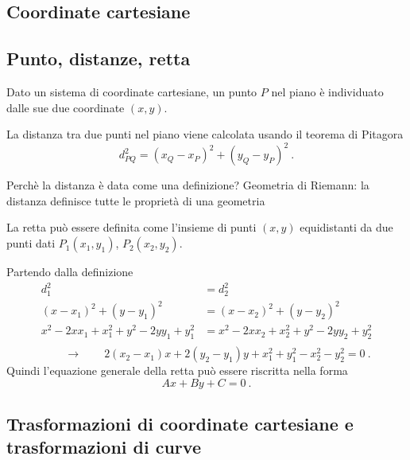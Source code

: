 \subsection{Coordinate cartesiane}
\subsection{Punto, distanze, retta}
\begin{definition}[Punto]
Dato un sistema di coordinate cartesiane, un punto $P$ nel piano è individuato dalle sue due coordinate $(x,y)$.
\end{definition}
\begin{definition}
La distanza tra due punti nel piano viene calcolata usando il teorema di Pitagora
\begin{equation}
    d_{PQ}^2 = (x_Q - x_P)^2 + (y_Q - y_P)^2 \ .
\end{equation}
\end{definition}
{\color{red} Perchè la distanza è data come una definizione? Geometria di Riemann: la distanza definisce tutte le proprietà di una geometria}

\begin{definition}[Retta]
    La retta può essere definita come l'insieme di punti $(x,y)$ equidistanti da due punti dati $P_1(x_1,y_1)$, $P_2(x_2,y_2)$.
\end{definition}
Partendo dalla definizione
\begin{equation}
\begin{aligned}
    d_1^2 & = d_2^2 \\
    (x - x_1)^2 + (y-y_1)^2 & = (x - x_2)^2 + (y-y_2)^2 \\
    x^2 - 2 x x_1 + x_1^2 + y^2 - 2 y y_1 + y_1^2 & = x^2 - 2 x x_2 + x_2^2 + y^2 - 2 y y_2 + y_2^2 \\
\end{aligned}
\end{equation}
\begin{equation}
  \qquad \rightarrow \qquad 2(x_2 - x_1) x + 2(y_2 - y_1) y + x_1^2 + y_1^2 - x_2^2 - y_2^2 = 0 \ .
\end{equation}
Quindi l'equazione generale della retta può essere riscritta nella forma
\begin{equation}
    A x + B y + C = 0 \ .
\end{equation}

\subsection{Trasformazioni di coordinate cartesiane e trasformazioni di curve}
